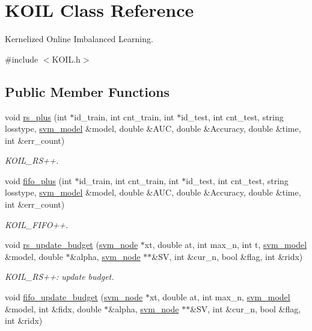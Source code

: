 \hypertarget{classKOIL}{\section{K\+O\+I\+L Class Reference}
\label{classKOIL}
}


Kernelized Online Imbalanced Learning.  




{\ttfamily \#include $<$K\+O\+I\+L.\+h$>$}

\subsection*{Public Member Functions}
\begin{DoxyCompactItemize}
\item 
void \hyperlink{classKOIL_a955e960acefa1e14bde3cfd966e09cee}{rs\+\_\+plus} (int $\ast$id\+\_\+train, int cnt\+\_\+train, int $\ast$id\+\_\+test, int cnt\+\_\+test, string losstype, \hyperlink{structsvm__model}{svm\+\_\+model} \&model, double \&A\+U\+C, double \&Accuracy, double \&time, int \&err\+\_\+count)
\begin{DoxyCompactList}\small\item\em K\+O\+I\+L\+\_\+\+R\+S++. \end{DoxyCompactList}\item 
void \hyperlink{classKOIL_a40e819db98e708acff5c1ecb3e5dd2d6}{fifo\+\_\+plus} (int $\ast$id\+\_\+train, int cnt\+\_\+train, int $\ast$id\+\_\+test, int cnt\+\_\+test, string losstype, \hyperlink{structsvm__model}{svm\+\_\+model} \&model, double \&A\+U\+C, double \&Accuracy, double \&time, int \&err\+\_\+count)
\begin{DoxyCompactList}\small\item\em K\+O\+I\+L\+\_\+\+F\+I\+F\+O++. \end{DoxyCompactList}\item 
void \hyperlink{classKOIL_a5c3c0e58872e51846c7544ba2133848e}{rs\+\_\+update\+\_\+budget} (\hyperlink{structsvm__node}{svm\+\_\+node} $\ast$xt, double at, int max\+\_\+n, int t, \hyperlink{structsvm__model}{svm\+\_\+model} \&model, double $\ast$\&alpha, \hyperlink{structsvm__node}{svm\+\_\+node} $\ast$$\ast$\&S\+V, int \&cur\+\_\+n, bool \&flag, int \&ridx)
\begin{DoxyCompactList}\small\item\em K\+O\+I\+L\+\_\+\+R\+S++\+: update budget. \end{DoxyCompactList}\item 
void \hyperlink{classKOIL_a1dab877e7a27788b0c24ffdfdb91e8fe}{fifo\+\_\+update\+\_\+budget} (\hyperlink{structsvm__node}{svm\+\_\+node} $\ast$xt, double at, int max\+\_\+n, \hyperlink{structsvm__model}{svm\+\_\+model} \&model, int \&fidx, double $\ast$\&alpha, \hyperlink{structsvm__node}{svm\+\_\+node} $\ast$$\ast$\&S\+V, int \&cur\+\_\+n, bool \&flag, int \&ridx)

\end{DoxyCompactItemize}
